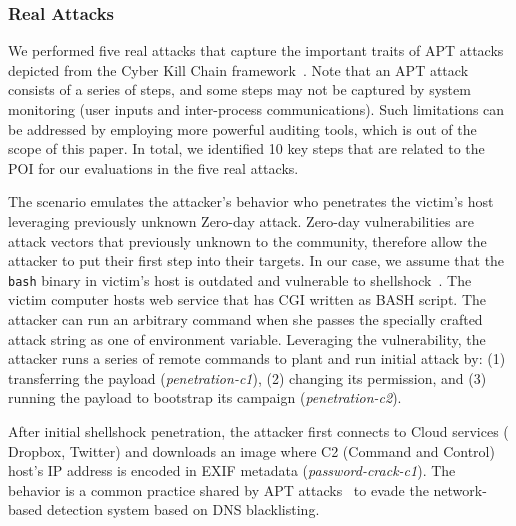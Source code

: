 \subsubsection{Real Attacks}
\label{subsubsec:attack-cases}

We performed five real attacks that capture the important traits of APT attacks depicted from the Cyber Kill Chain framework~\cite{cyberkillchain}. 
Note that an APT attack consists of a series of steps, and some steps may not be captured by system monitoring (\eg user inputs and inter-process communications).
Such limitations can be addressed by employing more powerful auditing tools, which is out of the scope of this paper.
In total, we identified 10 key steps that are related to the POI for our evaluations in the five real attacks.


The scenario emulates the attacker's behavior who penetrates the victim's host
leveraging previously unknown Zero-day attack. Zero-day vulnerabilities are
attack vectors that previously unknown to the community, therefore allow the
attacker to put their first step into their targets. In our case, we assume that
the {\tt bash} binary in victim's host is outdated and vulnerable to shellshock~\cite{shellshock}. The victim computer hosts web service that has
CGI written as BASH script. The attacker can run an arbitrary command when she
passes the specially crafted attack string as one of environment variable. Leveraging the vulnerability, the attacker runs a series of remote commands to
plant and run initial attack by: (1) transferring the payload (\emph{penetration-c1}), (2) changing its permission, and (3) running the payload to bootstrap its campaign (\emph{penetration-c2}).


After initial shellshock penetration, the attacker first connects to Cloud services (\eg
Dropbox, Twitter) and downloads an image where C2 (Command and Control) host's IP address is encoded in EXIF metadata (\emph{password-crack-c1}). The behavior is a common practice shared by APT attacks~\cite{hammertoss,vpnfilter} to evade the network-based detection system based on DNS blacklisting.

